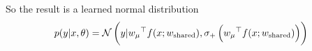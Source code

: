 So the result is a learned normal distribution
\begin{equation}
    p(y|x,\theta) = \mathcal{N}\left(y| {w_\mu}^\top f(x;w_{\text{shared}}), \sigma_{+} \left( {w_\mu}^\top f(x;w_{\text{shared}}) \right)  \right)
\end{equation}












































































































